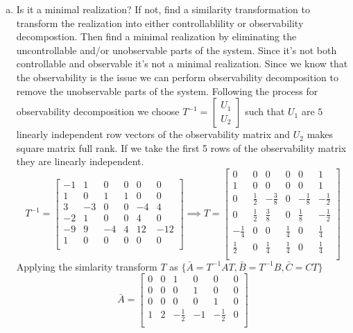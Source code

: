 \documentclass{article}
\begin{document}
\begin{enumerate}[(a)]
\item Is it a minimal realization?
If not, find a similarity transformation to transform the realization into either controllablility or observability decompostion.
Then find a minimal realization by eliminating the uncontrollable and/or unobservable parts of the system.
\newline
Since it's not both controllable and observable it's not a minimal realization.
Since we know that the observability is the issue we can perform observability decomposition to remove the unobservable parts of the system.
Following the process for observability decomposition we choose $T^{-1} = \begin{bmatrix}U_1 \\ U_2 \end{bmatrix}$ such that $U_1$ are $5$ linearly independent row vectors of the observability matrix and $U_2$ makes square matrix full rank.
If we take the first 5 rows of the observability matrix they are linearly independent.
$$
T^{-1} =
\begin{bmatrix}
-1 & 1 & 0 & 0 & 0 & 0 \\
1 & 0 & 1 & 1 & 0 & 0 \\
3 & -3 & 0 & 0 & -4 & 4 \\
-2 & 1 & 0 & 0 & 4 & 0 \\
-9 & 9 & -4 & 4 & 12 & -12 \\
1 & 0 & 0 & 0 & 0 & 0 \\
\end{bmatrix}
\implies
T =
\begin{bmatrix}
0 & 0 & 0 & 0 & 0 & 1 \\
1 & 0 & 0 & 0 & 0 & 1 \\
0 & \frac{1}{2} & -\frac{3}{8} & 0 & -\frac{1}{8} & -\frac{1}{2} \\
0 & \frac{1}{2} & \frac{3}{8} & 0 & \frac{1}{8} & -\frac{1}{2} \\
-\frac{1}{4} & 0 & 0 & \frac{1}{4} & 0 & \frac{1}{4} \\
\frac{1}{2} & 0 & \frac{1}{4} & \frac{1}{4} & 0 & \frac{1}{4} \\
\end{bmatrix}
$$
Applying the simlarity transform $T$ as $\{\bar{A} = T^{-1}AT, \bar{B}=T^{-1}B, \bar{C}=CT\}$
$$
\bar{A} =
\begin{bmatrix}
0 & 0 & 1 & 0 & 0 & 0 \\
0 & 0 & 0 & 1 & 0 & 0 \\
0 & 0 & 0 & 0 & 1 & 0 \\
1 & 2 & -\frac{1}{2} & -1 & -\frac{1}{2} & 0 \\

\end{bmatrix}$$
\end{enumerate}
\end{document}
